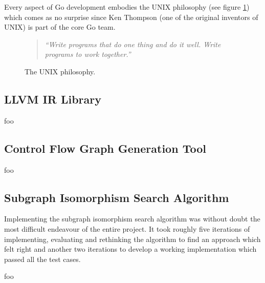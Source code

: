 Every aspect of Go development embodies the UNIX philosophy (see figure \ref{fig:unix_philosophy}) which comes as no surprise since Ken Thompson (one of the original inventors of UNIX) is part of the core Go team.

\begin{figure}[htbp]
	\begin{center}
		\begin{quote}
			\textit{``Write programs that do one thing and do it well. Write programs to work together.''} \cite{art_of_unix}
		\end{quote}
		\caption{The UNIX philosophy.}
		\label{fig:unix_philosophy}
	\end{center}
\end{figure}


\subsection{LLVM IR Library}

foo


\subsection{Control Flow Graph Generation Tool}

foo


\subsection{Subgraph Isomorphism Search Algorithm}

Implementing the subgraph isomorphism search algorithm was without doubt the most difficult endeavour of the entire project. It took roughly five iterations of implementing, evaluating and rethinking the algorithm to find an approach which felt right and another two iterations to develop a working implementation which passed all the test cases.

foo



